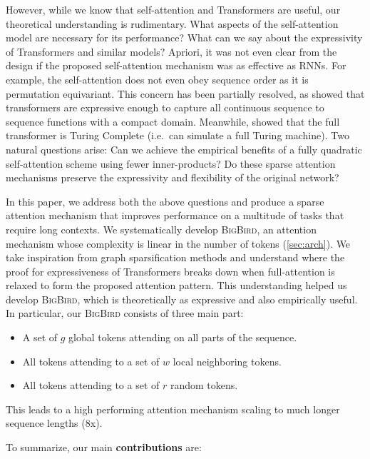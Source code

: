 However, while we know that self-attention and Transformers are useful, our theoretical understanding is rudimentary. What aspects of the self-attention model are necessary for its performance? What can we say about the expressivity of Transformers and similar models? Apriori, it was not even clear from the  design if the proposed self-attention mechanism was as effective as RNNs. For example, the self-attention does not even obey sequence order as it is permutation equivariant. This concern has been partially resolved, as \citet{Yun19} showed that transformers are expressive enough to capture all continuous sequence to sequence functions with a compact domain. Meanwhile, \citet{Perez19} showed that the full  transformer is Turing Complete (i.e.~can simulate a full Turing machine). Two natural questions arise: Can we achieve the empirical benefits of a fully quadratic self-attention scheme using fewer inner-products? Do these sparse attention mechanisms preserve the expressivity and flexibility of the original network?

In this paper, we address both the above questions and produce a sparse attention mechanism  that improves performance on a multitude of tasks that require long contexts. We systematically develop \textsc{BigBird}, an attention mechanism whose complexity is linear in the number of tokens (\ref{sec:arch}). We take inspiration from graph sparsification methods and understand  where the proof for expressiveness of Transformers breaks down when full-attention is relaxed to form the proposed attention pattern. This understanding helped us develop \textsc{BigBird}, which is theoretically as expressive and also empirically useful. In particular, our \textsc{BigBird} consists of three main part:

\begin{itemize}[leftmargin=6mm, itemsep=0mm, partopsep=0pt,parsep=0pt]
    \item A set of $g$ global tokens attending on all parts of the sequence.
    \item All tokens attending to a set of $w$ local neighboring tokens.
    \item All tokens attending to a set of $r$ random tokens.
\end{itemize}

This leads to a high performing attention mechanism scaling to much longer sequence lengths (8x).

To summarize, our main \textbf{contributions} are:

